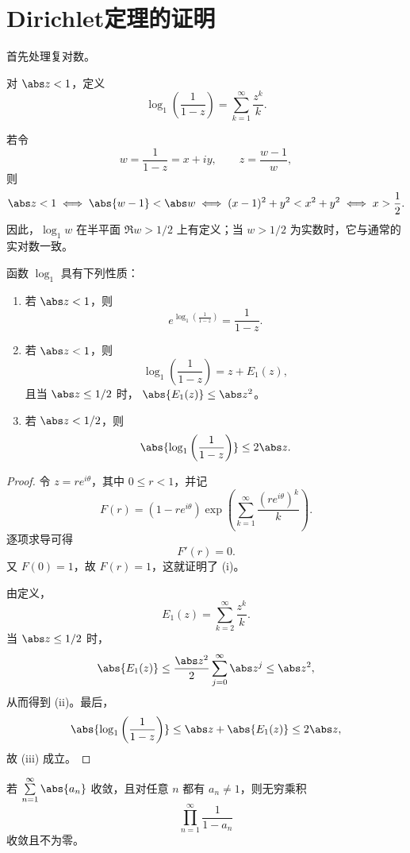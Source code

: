 \section{Dirichlet定理的证明}

首先处理复对数。

\begin{definition}
	对 $\abs z<1$，定义
\begin{equation}\label{eq:log-one-definition}
	\log_1\left(\frac1{1-z}\right)
	=\sum_{k=1}^{\infty}\frac{z^k}{k}.
\end{equation}
\end{definition}
若令
\[
w=\frac1{1-z}=x+iy,
\qquad
z=\frac{w-1}{w},
\]
则
\[
\abs z<1
\iff \abs{w-1}<\abs w
\iff (x-1)^2+y^2<x^2+y^2
\iff x>\frac12.
\]
因此，$\log_1w$ 在半平面 $\Re w>1/2$ 上有定义；当
$w>1/2$ 为实数时，它与通常的实对数一致。

\begin{proposition}\label{prop:log-one-properties}
	函数 $\log_1$ 具有下列性质：
	\begin{enumerate}[label=\textup{(\roman*)}]
		\item 若 $\abs z<1$，则
		\[
		e^{\log_1\left(\frac1{1-z}\right)}=\frac1{1-z}.
		\]
		\item 若 $\abs z<1$，则
		\[
		\log_1\left(\frac1{1-z}\right)=z+E_1(z),
		\]
		且当 $\abs z\leq1/2$ 时，
		$\abs{E_1(z)}\leq\abs z^2$。
		\item 若 $\abs z<1/2$，则
		\[
		\abs{\log_1\left(\frac1{1-z}\right)}\leq2\abs z.
		\]
	\end{enumerate}
\end{proposition}

\begin{proof}
	令 $z=re^{i\theta}$，其中 $0\leq r<1$，并记
	\[
	F(r)=(1-re^{i\theta})
	\exp\left(\sum_{k=1}^{\infty}\frac{(re^{i\theta})^k}{k}\right).
	\]
	逐项求导可得
	\[
	F'(r)=0.
	\]
	又 $F(0)=1$，故 $F(r)=1$，这就证明了 \textup{(i)}。

	由定义，
	\[
	E_1(z)=\sum_{k=2}^{\infty}\frac{z^k}{k}.
	\]
	当 $\abs z\leq1/2$ 时，
	\[
	\abs{E_1(z)}
	\leq\frac{\abs z^2}{2}\sum_{j=0}^{\infty}\abs z^j
	\leq\abs z^2,
	\]
	从而得到 \textup{(ii)}。最后，
	\[
	\abs{\log_1\left(\frac1{1-z}\right)}
	\leq\abs z+\abs{E_1(z)}
	\leq2\abs z,
	\]
	故 \textup{(iii)} 成立。
\end{proof}

\begin{proposition}\label{prop:absolute-convergence-infinite-product}
	若 $\sum\limits_{n=1}^{\infty}\abs{a_n}$ 收敛，且对任意 $n$ 都有
	$a_n\neq1$，则无穷乘积
	\[
	\prod_{n=1}^{\infty}\frac1{1-a_n}
	\]
	收敛且不为零。
\end{proposition}

